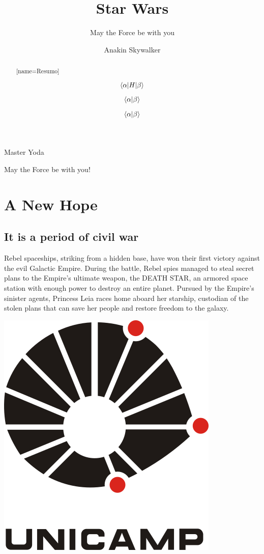 \documentclass[oneside]{ifgw}
\author{Anakin Skywalker}
\institute[Instituto Darth Plagueis]{Darth Plagueis Institute}
\title[Guerra nas estrelas]{Star Wars}
\subtitle[Que a Força esteja com você]{May the Force be with you}
\begin{document}
\maketitle
\makebackcover
\dedication{To my son, Luke Skywalker.}
\epigraph{Master Yoda}{May the Force be with you!}

\begin{abstract}[name=Resumo]
\lipsum[1]
\end{abstract}

\begin{abstract}
\lipsum[1]

\begin{equation}
\braket[H]{\alpha}{\beta}
\end{equation}

\begin{equation}
\braket{\alpha}{\beta}
\end{equation}

\begin{equation}
\braket[]{\alpha}{\beta}
\end{equation}

\end{abstract}

\tableofcontents

\chapter{A New Hope}
\section{It is a period of civil war}
Rebel spaceships, striking from a hidden base, have won 
their first victory against the evil Galactic Empire.  
During the battle, Rebel spies managed to steal secret 
plans to the Empire's ultimate weapon, the DEATH STAR, 
an armored space station with enough power to destroy 
an entire planet. Pursued by the Empire's sinister 
agents, Princess Leia races home aboard her starship, 
custodian of the stolen plans that can save her people 
and restore freedom to the galaxy.

\lipsum[1-3]

\begin{center}
\includegraphics[width=.35\textwidth]{Images/unicamp.png}
\end{center}
\end{document}
